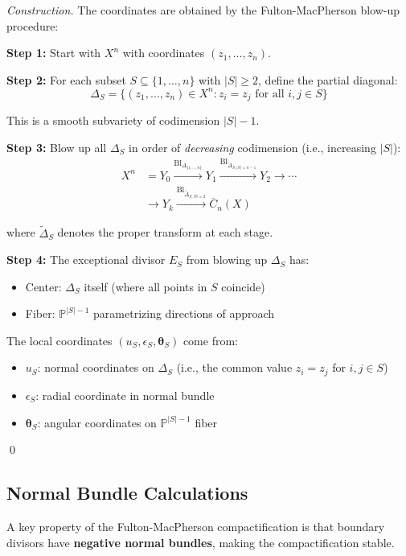 \begin{proof}[Construction]
The coordinates are obtained by the Fulton-MacPherson blow-up procedure:

\textbf{Step 1:} Start with $X^n$ with coordinates $(z_1, \ldots, z_n)$.

\textbf{Step 2:} For each subset $S \subseteq \{1,\ldots,n\}$ with $|S| \geq 2$, define
the partial diagonal:
$$\Delta_S = \{(z_1,\ldots,z_n) \in X^n : z_i = z_j \text{ for all } i,j \in S\}$$

This is a smooth subvariety of codimension $|S|-1$.

\textbf{Step 3:} Blow up all $\Delta_S$ in order of \emph{decreasing} codimension
(i.e., increasing $|S|$):
\begin{align*}
X^n &= Y_0 \xrightarrow{\text{Bl}_{\Delta_{\{1,\ldots,n\}}}} Y_1 
\xrightarrow{\text{Bl}_{\widetilde{\Delta}_{S, |S|=n-1}}} Y_2 \to \cdots\\
&\to Y_k \xrightarrow{\text{Bl}_{\widetilde{\Delta}_{S, |S|=2}}} \overline{C}_n(X)
\end{align*}

where $\widetilde{\Delta}_S$ denotes the proper transform at each stage.

\textbf{Step 4:} The exceptional divisor $E_S$ from blowing up $\Delta_S$ has:
\begin{itemize}
\item Center: $\Delta_S$ itself (where all points in $S$ coincide)
\item Fiber: $\mathbb{P}^{|S|-1}$ parametrizing directions of approach
\end{itemize}

The local coordinates $(u_S, \epsilon_S, \boldsymbol{\theta}_S)$ come from:
\begin{itemize}
\item $u_S$: normal coordinates on $\Delta_S$ (i.e., the common value $z_i = z_j$ for $i,j \in S$)
\item $\epsilon_S$: radial coordinate in normal bundle
\item $\boldsymbol{\theta}_S$: angular coordinates on $\mathbb{P}^{|S|-1}$ fiber
\end{itemize}
\qed
\end{proof}

\subsection{Normal Bundle Calculations}

A key property of the Fulton-MacPherson compactification is that boundary divisors have
\textbf{negative normal bundles}, making the compactification stable.

